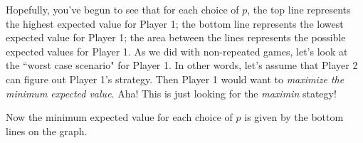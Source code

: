 
\begin{figure}
\begin{center}
   \label{BoldHalf}
\end{center}   
\end{figure}

Hopefully, you've begun to see that for each choice of $p$, the top line represents the highest expected value for Player 1; the bottom line represents the lowest expected value for Player 1; the area between the lines represents the possible expected values for Player 1. As we did with non-repeated games, let's look at the ``worst case scenario" for Player 1. In other words, let's assume that Player 2 can figure out Player 1's strategy. Then Player 1 would want to {\it maximize the minimum expected value}. Aha! This is just looking for the {\it maximin} stategy! 

Now the minimum expected value for each choice of $p$ is given by the bottom lines on the graph.


